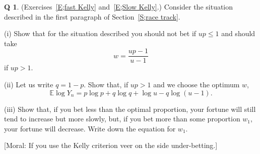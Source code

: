 \documentclass[12pt,a4paper]{article}
\theoremstyle{plain}
\theoremstyle{definition}
\newtheorem{question}[theorem]{Q}
\begin{document}
    \begin{question}
        \label{C2.8}
        (Exercises~\ref{E;fast Kelly}
        and~\ref{E;Slow Kelly}.) Consider the situation
        described in the first paragraph of Section~\ref{S;race track}.

        (i) Show that for the situation described
        you should not bet if $up\leq 1$ and should take
        \[w=\frac{up-1}{u-1}\]
        if $up>1$.

        (ii) Let us write $q=1-p$. Show that, if $up>1$ and we choose
        the optimum $w$,
        \[{\mathbb E}\log Y_{n}=p\log p+q\log q+\log u-q\log(u-1).\]

        (iii) Show that,
        if you bet less than the optimal proportion, your fortune
        will still tend to increase but more slowly, but, if you bet
        more than some proportion $w_{1}$, your fortune will decrease.
        Write down the equation for $w_{1}$.

        [Moral: If you use the Kelly criterion veer on the side under-betting.]
    \end{question}
\end{document}
